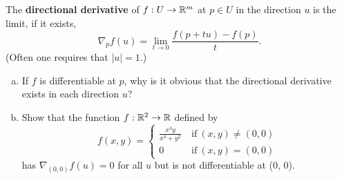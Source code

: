 \documentclass[a4paper, 12pt]{article}
\begin{document}
\begin{problem} 
The \textbf{directional derivative} of $f: U \to \mathbb{R}^m$ at $p \in U$ in the direction $u$ is the limit, if it exists, \[
    \nabla_p f(u) = \lim_{t\to 0} \frac{f(p + tu) - f(p)}{t}.
\]
(Often one requires that $|u| = 1$.)
\begin{enumerate} [(a)]
    \item If $f$ is differentiable at $p$, why is it obvious that the directional derivative exists in each direction $u$?
    \item Show that the function $f: \mathbb{R}^2 \to \mathbb{R}$ defined by \[
              f(x, y) = \begin{cases}
                  \frac{x^3y}{x^4 + y^2} & \:\text{if}\: (x, y) \neq (0, 0) \\
                  0                      & \:\text{if}\: (x, y) = (0, 0)
              \end{cases}
          \]
          has $\nabla_{(0, 0)} f(u) = 0$ for all $u$ but is not differentiable at (0, 0).
\end{enumerate}
\end{problem}
\end{document}
